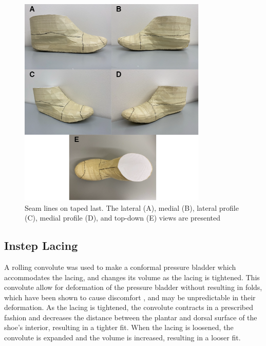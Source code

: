 \documentclass[defaultstyle,11pt]{comps}
\begin{document}
\begin{figure}
\hypertarget{fig:SA3-lasttape}{%
\centering
\includegraphics[width=0.8\textwidth,height=\textheight]{../fig/SA3/Last_Taping_Seams.png}
\caption{Seam lines on taped last. The lateral (A), medial (B), lateral profile (C), medial profile (D), and top-down (E) views are presented}\label{fig:SA3-lasttape}
}
\end{figure}

\hypertarget{instep-lacing}{%
\subsection{Instep Lacing}\label{instep-lacing}}

A rolling convolute was used to make a conformal pressure bladder which accommodates the lacing, and changes its volume as the lacing is tightened.
This convolute allow for deformation of the pressure bladder without resulting in folds, which have been shown to cause discomfort \citep{Chappell2017}, and may be unpredictable in their deformation.
As the lacing is tightened, the convolute contracts in a prescribed fashion and decreases the distance between the plantar and dorsal surface of the shoe's interior, resulting in a tighter fit.
When the lacing is loosened, the convolute is expanded and the volume is increased, resulting in a looser fit.
\end{document}
